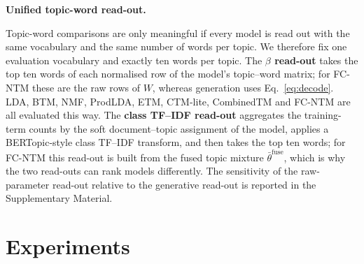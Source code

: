 \documentclass[Journal,letterpaper,NoLists]{ascelike-new}
\newcommand{\fcntm}{FC-NTM}
\begin{document}
\noindent\textbf{Unified topic-word read-out.} \label{sec:readout}

Topic-word comparisons are only meaningful if every model is read out with the same vocabulary and
the same number of words per topic. We therefore fix one evaluation vocabulary and exactly ten
words per topic. The \textbf{$\beta$ read-out} takes the top ten words of each normalised row of
the model's topic--word matrix; for \fcntm{} these are the raw rows of $W$, whereas generation
uses Eq.~\eqref{eq:decode}. LDA, BTM, NMF, ProdLDA, ETM, CTM-lite, CombinedTM and \fcntm{} are all
evaluated this way. The \textbf{class TF--IDF read-out} aggregates the training-term counts by the
soft document--topic assignment of the model, applies a BERTopic-style class TF--IDF transform,
and then takes the top ten words; for \fcntm{} this read-out is built from the fused topic mixture
$\bar\theta^{\mathrm{fuse}}$, which is why the two read-outs can rank models differently. The
sensitivity of the raw-parameter read-out relative to the generative read-out is reported in the
Supplementary Material.

\section{Experiments}
\end{document}
